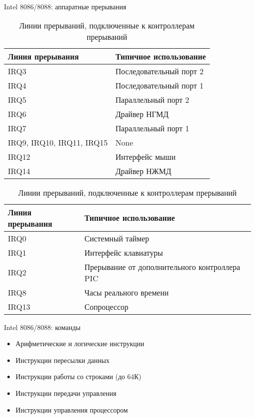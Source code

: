 \documentclass[aspectratio=169,14pt]{beamer}
\begin{document}
\begin{frame}{Intel 8086/8088: аппаратные прерывания}
    \begin{footnotesize}
    \begin{table}
        \centering
        \begin{tabular}{|p{4.4cm}|p{5cm}|}
            \hline
            \textbf{Линия прерывания} & \textbf{Типичное использование} \\ \hline
            IRQ3 & Последовательный порт 2 \\ \hline
            IRQ4 & Последовательный порт 1 \\ \hline
            IRQ5 & Параллельный порт 2 \\ \hline
            IRQ6 & Драйвер НГМД \\ \hline
            IRQ7 & Параллельный порт 1 \\ \hline
            IRQ9, IRQ10, IRQ11, IRQ15 & None \\ \hline
            IRQ12 & Интерфейс мыши \\ \hline
            IRQ14 & Драйвер НЖМД \\ \hline
        \end{tabular}
        \captionsetup{skip=-5pt}
        \caption{\tiny{Линии прерываний на шине ISA}}
        \begin{tabular}{|p{3.4cm}|p{7.8cm}|}
            \hline
            \textbf{Линия прерывания} & \textbf{Типичное использование} \\ \hline
            IRQ0 & Системный таймер \\ \hline
            IRQ1 & Интерфейс клавиатуры \\ \hline
            IRQ2 & Прерывание от дополнительного контроллера PIC \\ \hline
            IRQ8 & Часы реального времени \\ \hline
            IRQ13 & Сопроцессор \\ \hline
        \end{tabular}
        \captionsetup{skip=-5pt}
        \caption{\tiny{Линии прерываний, подключенные к контроллерам прерываний}}
    \end{table}
    \end{footnotesize}
\end{frame}

\begin{frame}{Intel 8086/8088: команды}
    \begin{itemize}
        \item Арифметические и логические инструкции
        \item Инструкции пересылки данных
        \item Инструкции работы со строками (до 64К)
        \item Инструкции передачи управления
        \item Инструкции управления процессором
    \end{itemize}
\end{frame}
\end{document}
